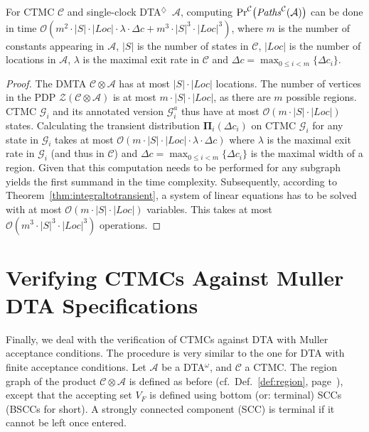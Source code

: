 \documentclass{LMCS}
\newcommand{\mc}[1]{\mathcal{#1}}
\newcommand{\<}{\langle}
\renewcommand{\>}{\rangle}
\newcommand{\les}{\leqslant}
\newcommand{\mC}{\mathcal{C}}
\newcommand{\mA}{\mathcal{A}}
\newcommand{\DTA}{\textsc{DTA}}
\newcommand{\DTAr}{\DTA$^{\!\Ever}$}
\newcommand{\DTAo}{\DTA$^{\omega}$}
\newcommand{\bdPi}{\mathbf{\Pi}}
\newcommand{\Paths}{{\it Paths}}
\newcommand{\F}{\mathop{\diamondsuit}}
\newcommand{\Ever}{\F}
\begin{document}
\begin{lem}
For CTMC $\mC$ and single-clock \DTAr\ $\mA$, computing
${\Pr}^\mC \big( \Paths^\mC(\mA) \big)$ can be done in time
$\mathcal{O}(m^2{\cdot}{\vert S\vert}{\cdot}{\vert Loc\vert}
{\cdot}\lambda{\cdot}\Delta c+m^3{\cdot}{\vert S\vert}^3{\cdot}{\vert Loc\vert}^3)$,
where $m$ is
the number of constants appearing in $\mA$,  $\vert S\vert$ is
the number of states in $\mC$, $\vert Loc\vert$ is the number
of locations in $\mA$, $\lambda$ is the maximal exit rate in
$\mC$ and $\Delta c = \max_{0 \les i<m}\{\Delta c_{i}\}$.
\end{lem}

\begin{proof}
The DMTA $\mc{C} \otimes \mc{A}$ has at most $| S | {\cdot} | Loc |$ locations.
The number of vertices in the PDP $\mc{Z}(\mc{C} \otimes \mc{A})$ is at most
$m {\cdot} | S | {\cdot} | Loc |$, as there are $m$ possible regions.
CTMC $\mc{G}_i$ and its annotated version $\mc{G}^a_i$ thus have at most
$\mathcal{O} \left( m {\cdot} | S | {\cdot} | Loc | \right)$ states.
Calculating the transient distribution $\bdPi_i(\Delta c_i)$ on CTMC $\mc{G}_i$
for any state in $\mc{G}_i$ takes at most $\mathcal{O} \left( m {\cdot} | S | {\cdot}
| Loc | {\cdot} \lambda {\cdot} \Delta c \right)$ where $\lambda$ is the maximal
exit rate in $\mc{G}_i$ (and thus in $\mC$) and $\Delta c = \max_{0 \les i<m}
\{\Delta c_{i}\}$ is the maximal width of a region.
Given that this computation needs to be performed for any subgraph yields the
first summand in the time complexity.
Subsequently, according to Theorem~\ref{thm:integraltotransient}, a system of
linear equations has to be solved with at most
$\mathcal{O}\left( m {\cdot} | S | {\cdot} | Loc | \right)$ variables.
This takes at most $\mathcal{O}\left( m^3 {\cdot} | S |^3 {\cdot} | Loc |^3 \right)$
operations.
\end{proof}

\section{Verifying CTMCs Against Muller DTA Specifications}\label{sec:infinite}

Finally, we deal with the verification of CTMCs against DTA with Muller acceptance
conditions.
The procedure is very similar to the one for DTA with finite acceptance conditions.
Let $\mA$ be a \DTAo, and $\mC$ a CTMC.
The region graph of the product $\mC \otimes \mA$ is defined as before (cf.\
Def.~\ref{def:region}, page~\pageref{def:region}), except that the accepting set
$V_F$ is defined using bottom (or: terminal) SCCs (BSCCs for short).
A strongly connected component (SCC) is terminal if it cannot be left once entered.
\end{document}
